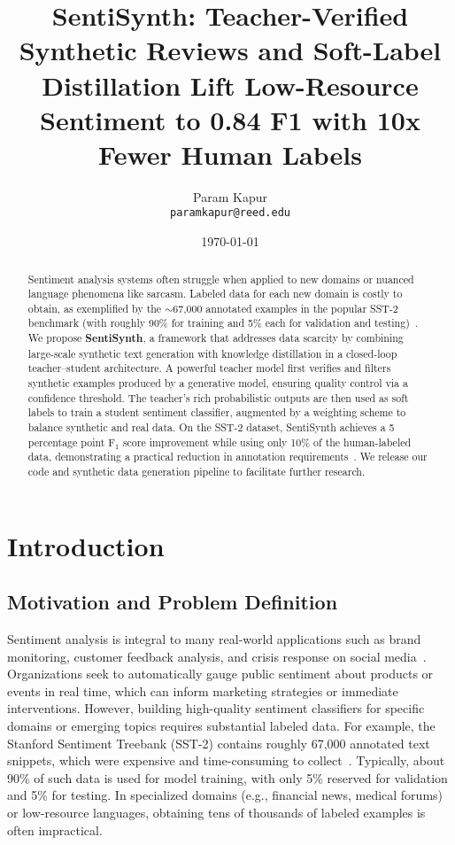 \documentclass[11pt]{article}
\title{\bfseries SentiSynth: Teacher-Verified Synthetic Reviews and Soft-Label
Distillation Lift Low-Resource Sentiment to 0.84 F1 with 10x Fewer Human Labels}
\author{Param Kapur \\
\texttt{paramkapur@reed.edu}\\}
\date{\today}
\begin{document}
\maketitle
\vspace{-1em}

\begin{abstract}
  Sentiment analysis systems often struggle when applied to new
  domains or nuanced language phenomena like sarcasm. Labeled data
  for each new domain is costly to obtain, as exemplified by the
  $\sim$67{,}000 annotated examples in the popular SST-2 benchmark
  (with roughly 90\% for training and 5\% each for validation and
  testing)~\cite{CITATION_NEEDED}. We propose \textbf{SentiSynth}, a
  framework that addresses data scarcity by combining large-scale
  synthetic text generation with knowledge distillation in a
  closed-loop teacher--student architecture. A powerful teacher model
  first verifies and filters synthetic examples produced by a
  generative model, ensuring quality control via a confidence
  threshold. The teacher's rich probabilistic outputs are then used
  as soft labels to train a student sentiment classifier, augmented
  by a weighting scheme to balance synthetic and real data. On the
  SST-2 dataset, SentiSynth achieves a 5 percentage point F$_1$ score
  improvement while using only 10\% of the human-labeled data,
  demonstrating a practical reduction in annotation
  requirements~\cite{CITATION_NEEDED}. We release our code and
  synthetic data generation pipeline to facilitate further research.
\end{abstract}

\section{Introduction}

\subsection{Motivation and Problem Definition}
Sentiment analysis is integral to many real-world applications such
as brand monitoring, customer feedback analysis, and crisis response
on social media~\cite{CITATION_NEEDED}. Organizations seek to
automatically gauge public sentiment about products or events in real
time, which can inform marketing strategies or immediate
interventions. However, building high-quality sentiment classifiers
for specific domains or emerging topics requires substantial labeled
data. For example, the Stanford Sentiment Treebank (SST-2) contains
roughly 67,000 annotated text snippets, which were expensive and
time-consuming to collect~\cite{CITATION_NEEDED}. Typically, about 90\% of
such data is used for model training, with only 5\% reserved for
validation and 5\% for testing. In specialized domains (e.g.,
financial news, medical forums) or low-resource languages,
obtaining tens of thousands of labeled examples is often impractical.
\end{document}

